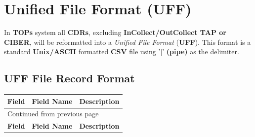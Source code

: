 \documentclass[12pt,twoside]{article}
\begin{document}
\section{Unified File Format (UFF)}
\label{sec:orgheadline18}
In \textbf{TOPs} system all \textbf{CDRs}, excluding \textbf{InCollect/OutCollect TAP or CIBER},
will be reformatted into a \emph{Unified File Format} (\textbf{UFF}). This format
is a standard \textbf{Unix/ASCII} formatted \textbf{CSV} file using '|'
\textbf{(pipe)} as the delimiter.
\subsection{UFF File Record Format}
\label{sec:orgheadline13}
\footnotesize

\begin{longtable}{c|l|l}
\hline
\textbf{Field} & \textbf{Field Name} & \textbf{Description}\\
\hline
\endfirsthead
\multicolumn{3}{l}{Continued from previous page} \\
\hline

\textbf{Field} & \textbf{Field Name} & \textbf{Description} \\


\end{longtable}
\end{document}
